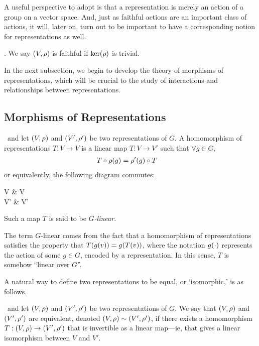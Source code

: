 A useful perspective to adopt is that a representation is merely an action of a group on a vector space. And, just as faithful actions are an important class of actions, it will, later on, turn out to be important to have a corresponding notion for representations as well.

\begin{definition}[Faithfulness] \label{Ch1:Def:Faithfulness}
    . We say $\left( V, \rho \right)$ is faithful if $\operatorname{ker}\!\left( \rho \right)$ is trivial.
\end{definition}

In the next subsection, we begin to develop the theory of morphisms of representations, which will be crucial to the study of interactions and relationships between representations.

\subsection{Morphisms of Representations}

\begin{boxdefinition}
    \ and let $\left( V,\rho \right)$ and $\left( V',\rho' \right)$ be two representations of $G$. A homomorphism of representations $T : V \to V$ is a linear map $T : V \to V'$ such that $\forall g \in G$,
    \begin{align*}
        T \circ \rho\!\left( g \right) &= \rho'(g) \circ T
    \end{align*}
    or equivalently, the following diagram commutes:
    \begin{cd}
        V \arrow[r, "\rho(g)"] \arrow[d, "T"'] & V \arrow[d, "T"] \\
        V' \arrow[r, "\rho'(g)"'] & V'
        \label{Ch1:eq:cd_rep_map}
    \end{cd}
    Such a map $T$ is said to be \textit{$G$-linear}.
\end{boxdefinition}

\begin{remark}
    The term $G$-linear comes from the fact that a homomorphism of representations satisfies the property that $T\!\left( g(v) \right) = g\!\left( T\!\left( v \right) \right)$, where the notation $g\!\left( \cdot \right)$ represents the action of some $g \in G$, encoded by a representation. In this sense, $T$ is somehow ``linear over $G$''.
\end{remark}

A natural way to define two representations to be equal, or `isomorphic,' is as follows.

\begin{definition}
    \ and let $\left( V,\rho \right)$ and $\left( V',\rho' \right)$ be two representations of $G$. We say that $\left( V,\rho \right)$ and $\left( V',\rho' \right)$ are equivalent, denoted $\left( V,\rho \right) \sim \left( V',\rho' \right)$, if there exists a homomorphism $T : \left( V,\rho \right) \to \left( V',\rho' \right)$ that is invertible as a linear map---ie, that gives a linear isomorphism between $V$ and $V'$.
\end{definition}

